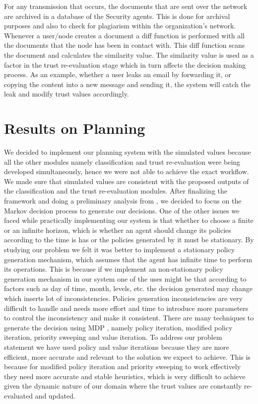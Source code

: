 For any transmission that occurs, the
documents that are sent over the network are archived in a database of the
Security agents. This is done for archival purposes and also to check for
plagiarism within the organization’s network. Whenever a user/node creates
a document a diff function is performed with all the documents that the node
has been in contact with. This diff function scans the document and
calculates the similarity value. The similarity value is used as a factor in
the trust re-evaluation stage which in turn affects the decision making
process. As an example, whether a user leaks an email by forwarding it, or
copying the content into a new message and sending it, the system will catch
the leak and modify trust values accordingly.

\section{Results on Planning}
We decided to implement our planning system with the
simulated values because all the other modules namely classification and trust
re-evaluation were being developed simultaneously, hence we were not able to
achieve the exact workflow. We made sure that simulated values are consistent
with the proposed outputs of the classification and the trust re-evaluation
modules. After finalizing the framework and doing a preliminary analysis from
\autocite{Norvig2012}, we decided to focus on the Markov decision process to generate our
decisions.  One of the other issues we faced while practically implementing our
system is that whether to choose a finite or an infinite horizon, which is
whether an agent should change its policies according to the time is has or the
policies generated by it must be stationary. By studying our problem we felt it
was better to implement a stationary policy generation mechanism, which assumes
that the agent has infinite time to perform its operations. This is because if
we implement an non-stationary policy generation mechanism in our system one of
the uses might be that according to factors such as day of time, month, levels,
etc. the decision generated may change which inserts lot of inconsistencies.
Policies generation inconsistencies are very difficult to handle and needs more
effort and time to introduce more parameters to control the inconsistency and
make it consistent.  There are many techniques to generate the decision using
MDP \autocite{Wikipedia2013}, namely policy iteration, modified policy iteration, priority sweeping
and value iteration. To address our problem statement we have used policy and
value iterations because they are more efficient, more accurate and relevant to
the solution we expect to achieve. This is because for modified policy iteration
and priority sweeping to work effectively they need more accurate and stable
heuristics, which is very difficult to achieve given the dynamic nature of our
domain where the trust values are constantly re-evaluated and updated. 

